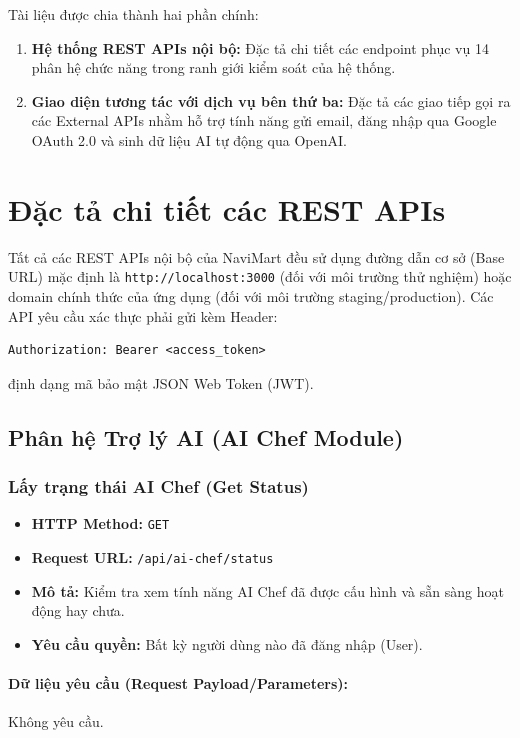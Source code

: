 \documentclass[12pt,a4paper]{article}
\begin{document}
Tài liệu được chia thành hai phần chính:
\begin{enumerate}
    \item \textbf{Hệ thống REST APIs nội bộ:} Đặc tả chi tiết các endpoint phục vụ 14 phân hệ chức năng trong ranh giới kiểm soát của hệ thống.
    \item \textbf{Giao diện tương tác với dịch vụ bên thứ ba:} Đặc tả các giao tiếp gọi ra các External APIs nhằm hỗ trợ tính năng gửi email, đăng nhập qua Google OAuth 2.0 và sinh dữ liệu AI tự động qua OpenAI.
\end{enumerate}

\newpage

\section{Đặc tả chi tiết các REST APIs}
Tất cả các REST APIs nội bộ của NaviMart đều sử dụng đường dẫn cơ sở (Base URL) mặc định là \texttt{http://localhost:3000} (đối với môi trường thử nghiệm) hoặc domain chính thức của ứng dụng (đối với môi trường staging/production). Các API yêu cầu xác thực phải gửi kèm Header:
\begin{verbatim}
Authorization: Bearer <access_token>
\end{verbatim}
định dạng mã bảo mật JSON Web Token (JWT).

\vskip 0.5cm
\subsection{Phân hệ Trợ lý AI (AI Chef Module)}

\subsubsection{Lấy trạng thái AI Chef (Get Status)}
\begin{itemize}[leftmargin=*]
    \item \textbf{HTTP Method:} \texttt{GET}
    \item \textbf{Request URL:} \texttt{/api/ai-chef/status}
    \item \textbf{Mô tả:} Kiểm tra xem tính năng AI Chef đã được cấu hình và sẵn sàng hoạt động hay chưa.
    \item \textbf{Yêu cầu quyền:} Bất kỳ người dùng nào đã đăng nhập (User).
\end{itemize}

\paragraph{Dữ liệu yêu cầu (Request Payload/Parameters):}
Không yêu cầu.\\
\end{document}
